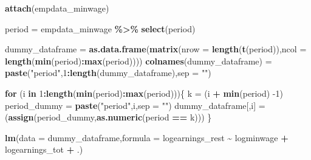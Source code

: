 \documentclass[
]{article}
\newenvironment{Shaded}{\begin{snugshade}}{\end{snugshade}}
\newcommand{\ControlFlowTok}[1]{\textcolor[rgb]{0.13,0.29,0.53}{\textbf{#1}}}
\newcommand{\DataTypeTok}[1]{\textcolor[rgb]{0.13,0.29,0.53}{#1}}
\newcommand{\DecValTok}[1]{\textcolor[rgb]{0.00,0.00,0.81}{#1}}
\newcommand{\KeywordTok}[1]{\textcolor[rgb]{0.13,0.29,0.53}{\textbf{#1}}}
\newcommand{\NormalTok}[1]{#1}
\newcommand{\OperatorTok}[1]{\textcolor[rgb]{0.81,0.36,0.00}{\textbf{#1}}}
\newcommand{\StringTok}[1]{\textcolor[rgb]{0.31,0.60,0.02}{#1}}
\begin{document}
\begin{Shaded}
\begin{Highlighting}[]
\KeywordTok{attach}\NormalTok{(empdata\_minwage)}

\NormalTok{period =}\StringTok{ }\NormalTok{empdata\_minwage }\OperatorTok{\%\textgreater{}\%}
\StringTok{  }\KeywordTok{select}\NormalTok{(period)}

\NormalTok{dummy\_dataframe =}\StringTok{ }\KeywordTok{as.data.frame}\NormalTok{(}\KeywordTok{matrix}\NormalTok{(}\DataTypeTok{nrow =} \KeywordTok{length}\NormalTok{(}\KeywordTok{t}\NormalTok{(period)),}\DataTypeTok{ncol =} \KeywordTok{length}\NormalTok{(}\KeywordTok{min}\NormalTok{(period)}\OperatorTok{:}\KeywordTok{max}\NormalTok{(period))))}
\KeywordTok{colnames}\NormalTok{(dummy\_dataframe) =}\StringTok{ }\KeywordTok{paste}\NormalTok{(}\StringTok{"period"}\NormalTok{,}\DecValTok{1}\OperatorTok{:}\KeywordTok{length}\NormalTok{(dummy\_dataframe),}\DataTypeTok{sep =} \StringTok{""}\NormalTok{)}


\ControlFlowTok{for}\NormalTok{ (i }\ControlFlowTok{in} \DecValTok{1}\OperatorTok{:}\KeywordTok{length}\NormalTok{(}\KeywordTok{min}\NormalTok{(period)}\OperatorTok{:}\KeywordTok{max}\NormalTok{(period)))\{}
\NormalTok{   k =}\StringTok{ }\NormalTok{(i }\OperatorTok{+}\StringTok{ }\KeywordTok{min}\NormalTok{(period) }\DecValTok{{-}1}\NormalTok{)}
\NormalTok{   period\_dummy =}\StringTok{ }\KeywordTok{paste}\NormalTok{(}\StringTok{"period"}\NormalTok{,i,}\DataTypeTok{sep =} \StringTok{""}\NormalTok{)}
\NormalTok{   dummy\_dataframe[,i] =}\StringTok{ }\NormalTok{(}\KeywordTok{assign}\NormalTok{(period\_dummy,}\KeywordTok{as.numeric}\NormalTok{(period }\OperatorTok{==}\StringTok{ }\NormalTok{k))) }
\NormalTok{\}}



\KeywordTok{lm}\NormalTok{(}\DataTypeTok{data =}\NormalTok{ dummy\_dataframe,}\DataTypeTok{formula =}\NormalTok{ logearnings\_rest }\OperatorTok{\textasciitilde{}}\StringTok{ }\NormalTok{logminwage }\OperatorTok{+}\StringTok{ }\NormalTok{logearnings\_tot }\OperatorTok{+}\StringTok{ }\NormalTok{.)}
\end{Highlighting}
\end{Shaded}
\end{document}
